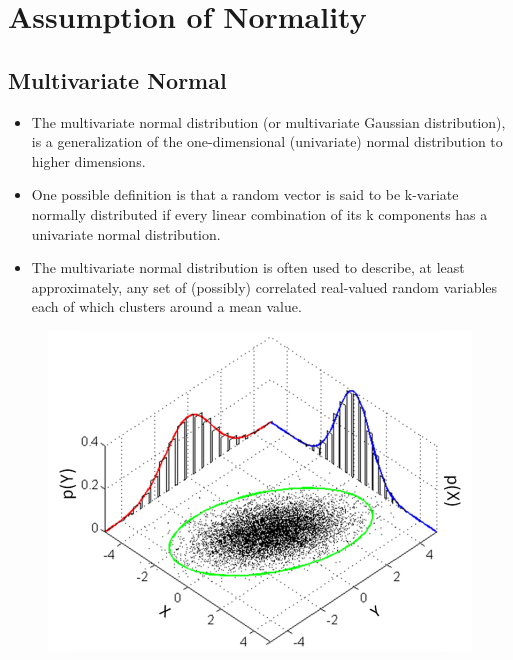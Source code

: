 \documentclass[SPC-MASTER.tex]{subfiles}
\begin{document}
\Large
	
\section{Assumption of Normality}
\subsection{Multivariate Normal}
{\Large
\begin{itemize}
\item The multivariate normal distribution (or multivariate Gaussian distribution), is a generalization of the one-dimensional (univariate) normal distribution to higher dimensions.\item One possible definition is that a random vector is said to be k-variate normally distributed if every linear combination of its k components has a univariate normal distribution. 
\item The multivariate normal distribution is often used to describe, at least approximately, any set of (possibly) correlated real-valued random variables each of which clusters around a mean value.
\end{itemize}
}
\begin{figure}[h!]
\centering
\includegraphics[width=0.8\linewidth]{./793px-MultivariateNormal}
\caption{}
\label{fig:793px-MultivariateNormal}
\end{figure}
\newpage
\end{document}
